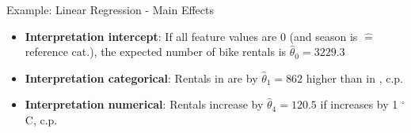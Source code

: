 \documentclass[11pt,compress,t,notes=noshow, aspectratio=169, xcolor=table]{beamer}
\begin{document}
\begin{frame}{Example: Linear Regression - Main Effects}
\lz


%

\begin{itemize}[<+->]
    \item \textbf{Interpretation intercept}:
    If all feature values are 0 (and season is  $\hat =$ reference cat.), the expected number of bike rentals is $\hat\theta_0 = 3229.3$
    \item \textbf{Interpretation categorical}: Rentals in  are by $\hat\theta_1 = 862$ higher than in , c.p.
    \item \textbf{Interpretation numerical}: Rentals increase by $\hat\theta_4 = 120.5$ if  increases by 1 $^{\circ}$C, c.p.

\end{itemize}
\end{frame}


\end{document}
